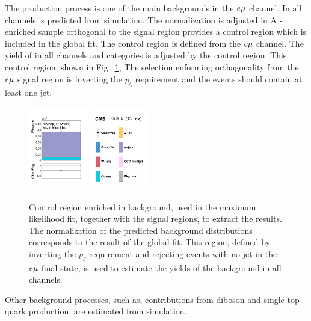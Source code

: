 The \ttbar production process is one of the main backgrounds in the $e\mu$ channel.
In all channels \ttbar is predicted from simulation. The normalization is adjusted in
A \ttbar-enriched sample orthogonal to the signal region provides a control region which is included
in the global fit. The \ttbar control region is defined from the $e\mu$ channel. The yield
of \ttbar in all channels and categories is adjusted by the \ttbar control region.
This control region, shown in Fig.~\ref{fig:htt_ttbar_CR2},
The selection enforming orthagonality from the $e\mu$ signal region is inverting the $p_\zeta$ requirement
and the events should contain at least one jet.

\begin{figure}[htb]
\centering
     \includegraphics[width=0.23\textwidth]{higgs_to_taus/plots/Figure_005-a.pdf}
     \includegraphics[width=0.23\textwidth]{higgs_to_taus/plots/Figure_005-b.pdf}
     \caption{Control region enriched in \ttbar background, used in the maximum likelihood fit, 
together with the signal regions, to extract the results. The normalization of the predicted background 
distributions corresponds to the result of the global fit. This region, defined by inverting the 
$p_\zeta$ requirement and rejecting events with no jet in the $e\mu$ final state, is used to estimate the
yields of the \ttbar background in all channels.}
     \label{fig:htt_ttbar_CR2}
\end{figure}

Other background processes, such as, contributions from diboson and single top quark production, are estimated 
from simulation.

